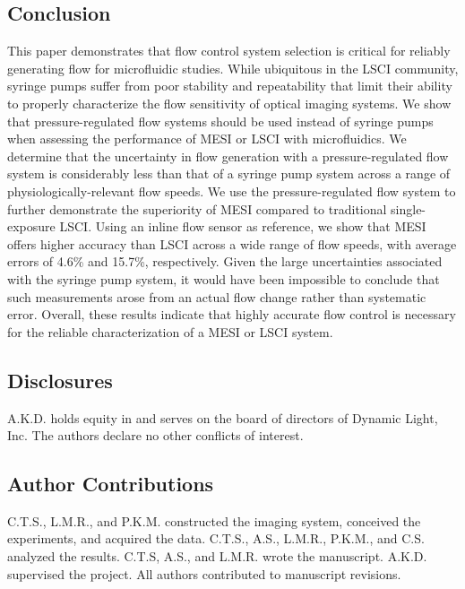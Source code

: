 \documentclass[12pt]{spieman}
\begin{document}
\begin{spacing}{2}
\section{Conclusion}
\label{sect:conclusion}

This paper demonstrates that flow control system selection is critical for reliably generating flow for microfluidic studies. While ubiquitous in the LSCI community, syringe pumps suffer from poor stability and repeatability that limit their ability to properly characterize the flow sensitivity of optical imaging systems. We show that pressure-regulated flow systems should be used instead of syringe pumps when assessing the performance of MESI or LSCI with microfluidics. We determine that the uncertainty in flow generation with a pressure-regulated flow system is considerably less than that of a syringe pump system across a range of physiologically-relevant flow speeds. We use the pressure-regulated flow system to further demonstrate the superiority of MESI compared to traditional single-exposure LSCI. Using an inline flow sensor as reference, we show that MESI offers higher accuracy than LSCI across a wide range of flow speeds, with average errors of 4.6\% and 15.7\%, respectively. Given the large uncertainties associated with the syringe pump system, it would have been impossible to conclude that such measurements arose from an actual flow change rather than systematic error. Overall, these results indicate that highly accurate flow control is necessary for the reliable characterization of a MESI or LSCI system.


\subsection*{Disclosures}
A.K.D. holds equity in and serves on the board of directors of Dynamic Light, Inc. The authors declare no other conflicts of interest.

\subsection*{Author Contributions}
C.T.S., L.M.R., and P.K.M. constructed the imaging system, conceived the experiments, and acquired the data. C.T.S., A.S., L.M.R., P.K.M., and C.S. analyzed the results. C.T.S, A.S., and L.M.R. wrote the manuscript. A.K.D. supervised the project. All authors contributed to manuscript revisions.


\end{spacing}
\end{document}
